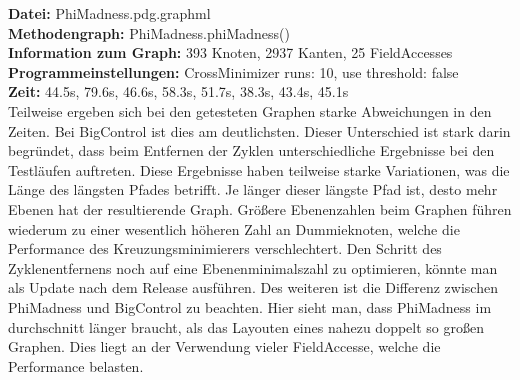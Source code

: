 \textbf{Datei: }PhiMadness.pdg.graphml\\
\textbf{Methodengraph: }PhiMadness.phiMadness()\\
\textbf{Information zum Graph: }393 Knoten, 2937 Kanten, 25 FieldAccesses\\
\textbf{Programmeinstellungen: }CrossMinimizer runs: 10, use threshold: false\\
\textbf{Zeit: }44.5s, 79.6s, 46.6s, 58.3s, 51.7s, 38.3s, 43.4s, 45.1s\\

Teilweise ergeben sich bei den getesteten Graphen starke Abweichungen in den Zeiten. Bei BigControl ist dies am deutlichsten. Dieser Unterschied ist stark darin begründet, dass beim Entfernen der Zyklen unterschiedliche Ergebnisse bei den Testläufen auftreten. Diese Ergebnisse haben teilweise starke Variationen, was die Länge des längsten Pfades betrifft. Je länger dieser längste Pfad ist, desto mehr Ebenen hat der resultierende Graph. Größere Ebenenzahlen beim Graphen führen wiederum zu einer wesentlich höheren Zahl an Dummieknoten, welche die Performance des Kreuzungsminimierers verschlechtert. Den Schritt des Zyklenentfernens noch auf eine Ebenenminimalszahl zu optimieren, könnte man als Update nach dem Release ausführen.
Des weiteren ist die Differenz zwischen PhiMadness und BigControl zu beachten. Hier sieht man, dass PhiMadness im durchschnitt länger braucht, als das Layouten eines nahezu doppelt so großen Graphen. Dies liegt an der Verwendung vieler FieldAccesse, welche die Performance belasten.



